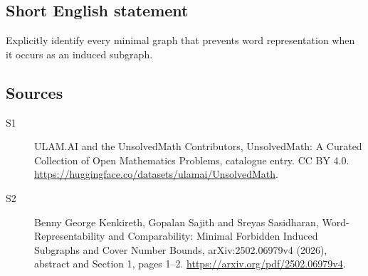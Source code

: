 \documentclass[11pt]{article}
\begin{document}
\subsection{Short English statement}
Explicitly identify every minimal graph that prevents word representation when it occurs as an induced subgraph.
\subsection{Sources}
\begin{description}
\item[\hypertarget{source:statement:1}{S1}] ULAM.AI and the UnsolvedMath Contributors, UnsolvedMath: A Curated Collection of Open Mathematics Problems, catalogue entry. CC BY 4.0. \url{https://huggingface.co/datasets/ulamai/UnsolvedMath}.
\item[\hypertarget{source:statement:2}{S2}] Benny George Kenkireth, Gopalan Sajith and Sreyas Sasidharan, Word-Representability and Comparability: Minimal Forbidden Induced Subgraphs and Cover Number Bounds, arXiv:2502.06979v4 (2026), abstract and Section 1, pages 1--2. \url{https://arxiv.org/pdf/2502.06979v4}.
\end{description}
\label{end:statement}
\end{document}
